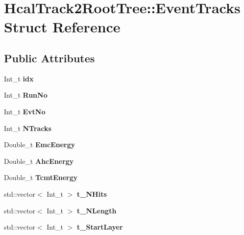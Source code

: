 \section{Hcal\-Track2\-Root\-Tree\-:\-:Event\-Tracks Struct Reference}
\label{structHcalTrack2RootTree_1_1EventTracks}
\subsection*{Public Attributes}
\begin{DoxyCompactItemize}
\item 
Int\-\_\-t {\bfseries idx}\label{structHcalTrack2RootTree_1_1EventTracks_ad0cfcaf5d1c739ea38d6d05379e70d46}

\item 
Int\-\_\-t {\bfseries Run\-No}\label{structHcalTrack2RootTree_1_1EventTracks_a72f2818d16ddc07c2788693d7146feee}

\item 
Int\-\_\-t {\bfseries Evt\-No}\label{structHcalTrack2RootTree_1_1EventTracks_a0c8df9e977ab81885c242e19a0f41c30}

\item 
Int\-\_\-t {\bfseries N\-Tracks}\label{structHcalTrack2RootTree_1_1EventTracks_ab58502846543030fab294e43a8019273}

\item 
Double\-\_\-t {\bfseries Emc\-Energy}\label{structHcalTrack2RootTree_1_1EventTracks_afed7fbe98b7c1f1a2aaaf469ca144237}

\item 
Double\-\_\-t {\bfseries Ahc\-Energy}\label{structHcalTrack2RootTree_1_1EventTracks_a02444b4090c362423d120c984e77f257}

\item 
Double\-\_\-t {\bfseries Tcmt\-Energy}\label{structHcalTrack2RootTree_1_1EventTracks_a34ec7af2977a4fcd1d4e035020516de7}

\item 
std\-::vector$<$ Int\-\_\-t $>$ {\bfseries t\-\_\-\-N\-Hits}\label{structHcalTrack2RootTree_1_1EventTracks_aa6be816c60658808b3cd83c15b5d405d}

\item 
std\-::vector$<$ Int\-\_\-t $>$ {\bfseries t\-\_\-\-N\-Length}\label{structHcalTrack2RootTree_1_1EventTracks_a783113a6c4ada573e45cc0e7ece5a16e}

\item 
std\-::vector$<$ Int\-\_\-t $>$ {\bfseries t\-\_\-\-Start\-Layer}\label{structHcalTrack2RootTree_1_1EventTracks_a47ecd9b7591f4e5485fda74c1c2672bd}


\end{DoxyCompactItemize}
